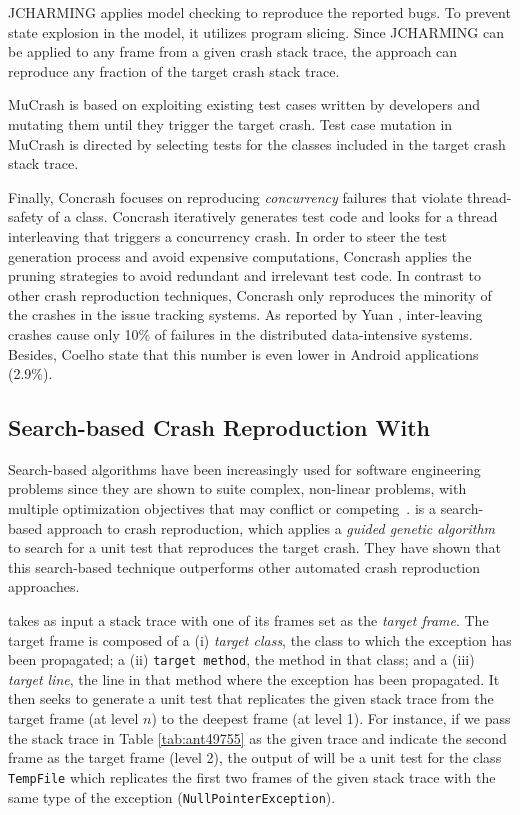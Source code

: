 \textrm{JCHARMING} \cite{Nayrolles2017} applies model checking to reproduce the reported bugs. To prevent state explosion in the model, it utilizes program slicing.
Since \textrm{JCHARMING} can be applied to any frame from a given crash stack trace, the approach can reproduce any fraction of the target crash stack trace. 

\textrm{MuCrash} \cite{Xuan2015} is based on exploiting existing test cases written by developers and mutating them until they trigger the target crash.
Test case mutation in \textrm{MuCrash} is directed by selecting tests for the classes included in the target crash stack trace. 

Finally, \textrm{Concrash} \cite{BPT17concrash} focuses on reproducing \textit{concurrency} failures that violate thread-safety of a class.
\textrm{Concrash} iteratively generates test code and looks for a thread interleaving that triggers a concurrency crash.
In order to steer the test generation process and avoid expensive computations, \textrm{Concrash} applies the pruning strategies to avoid redundant and irrelevant test code. In contrast to other crash reproduction techniques, \textrm{Concrash} only reproduces the minority of the crashes in the issue tracking systems. As reported by Yuan \etal \cite{Yuan2014}, inter-leaving crashes cause only 10\% of failures in the distributed data-intensive systems. Besides, Coelho \etal \cite{Coelho2015} state that this number is even lower in Android applications (2.9\%).

\subsection{Search-based Crash Reproduction With \evocrash}

Search-based algorithms have been increasingly used for software engineering problems since they are shown to suite complex, non-linear problems, with multiple optimization objectives that may conflict or competing~\cite{harman12trends}.
\evocrash \cite{soltani2017, Soltani2018a} is a search-based approach to crash reproduction, which applies a \textit{guided genetic algorithm} to search for a unit test that reproduces the target crash. They have shown that this search-based technique outperforms other automated crash reproduction approaches.

\evocrash takes as input a stack trace with one of its frames set as the \emph{target frame}. 
The target frame is composed of a
(i) \emph{target class}, the class to which the exception has been propagated; a
(ii) \texttt{target method}, the method in that class; and a
(iii) \emph{target line}, the line in that method where the exception has been propagated. 
It then seeks to generate a unit test that replicates the given stack trace from the target frame (at level $n$) to the deepest frame (at level 1). 
For instance, if we pass the stack trace in Table \ref{tab:ant49755} as the given trace and indicate the second frame as the target frame (level 2), the output of \evocrash will be a unit test for the class \texttt{TempFile} which replicates the first two frames of the given stack trace with the same type of the exception (\texttt{NullPointerException}).

